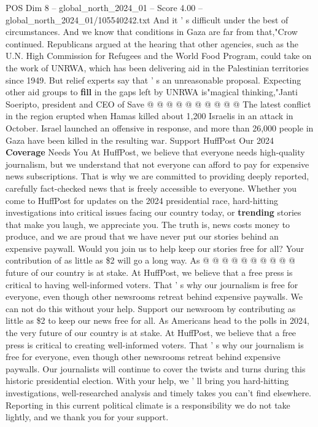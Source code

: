 \begin{textsample}{POS Dim 8 – global\_north\_2024\_01 – Score 4.00 – global\_north\_2024\_01/105540242.txt}
And it ' s difficult under the best of circumstances.
And we know that conditions in Gaza are far from that,"Crow continued.
Republicans argued at the hearing that other agencies, such as the U.N.
High Commission for Refugees and the World Food Program, could take on the work of UNRWA, which has been delivering aid in the Palestinian territories since 1949.
But relief experts say that ' s an unreasonable proposal.
Expecting other aid groups to \textbf{fill} in the gaps left by UNRWA is"magical thinking,"Janti Soeripto, president and CEO of Save @ @ @ @ @ @ @ @ @ @ The latest conflict in the region erupted when Hamas killed about 1,200 Israelis in an attack in October.
Israel launched an offensive in response, and more than 26,000 people in Gaza have been killed in the resulting war.
Support HuffPost Our 2024 \textbf{Coverage} Needs You At HuffPost, we believe that everyone needs high-quality journalism, but we understand that not everyone can afford to pay for expensive news subscriptions.
That is why we are committed to providing deeply reported, carefully fact-checked news that is freely accessible to everyone.
Whether you come to HuffPost for updates on the 2024 presidential race, hard-hitting investigations into critical issues facing our country today, or \textbf{trending} stories that make you laugh, we appreciate you.
The truth is, news costs money to produce, and we are proud that we have never put our stories behind an expensive paywall.
Would you join us to help keep our stories free for all?
Your contribution of as little as \$2 will go a long way.
As @ @ @ @ @ @ @ @ @ @ future of our country is at stake.
At HuffPost, we believe that a free press is critical to having well-informed voters.
That ' s why our journalism is free for everyone, even though other newsrooms retreat behind expensive paywalls.
We can not do this without your help.
Support our newsroom by contributing as little as \$2 to keep our news free for all.
As Americans head to the polls in 2024, the very future of our country is at stake.
At HuffPost, we believe that a free press is critical to creating well-informed voters.
That ' s why our journalism is free for everyone, even though other newsrooms retreat behind expensive paywalls.
Our journalists will continue to cover the twists and turns during this historic presidential election.
With your help, we ' ll bring you hard-hitting investigations, well-researched analysis and timely takes you can't find elsewhere.
Reporting in this current political climate is a responsibility we do not take lightly, and we thank you for your support.

\end{textsample}
